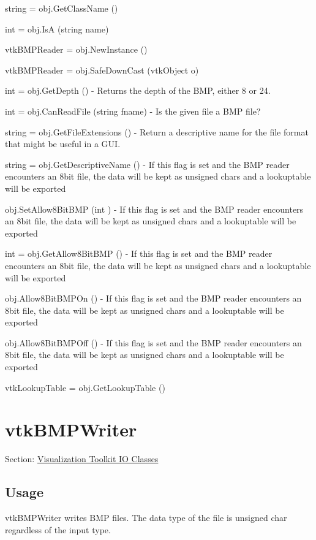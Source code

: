 \begin{DoxyItemize}
\item {\ttfamily string = obj.\-Get\-Class\-Name ()}  
\item {\ttfamily int = obj.\-Is\-A (string name)}  
\item {\ttfamily vtk\-B\-M\-P\-Reader = obj.\-New\-Instance ()}  
\item {\ttfamily vtk\-B\-M\-P\-Reader = obj.\-Safe\-Down\-Cast (vtk\-Object o)}  
\item {\ttfamily int = obj.\-Get\-Depth ()} -\/ Returns the depth of the B\-M\-P, either 8 or 24.  
\item {\ttfamily int = obj.\-Can\-Read\-File (string fname)} -\/ Is the given file a B\-M\-P file?  
\item {\ttfamily string = obj.\-Get\-File\-Extensions ()} -\/ Return a descriptive name for the file format that might be useful in a G\-U\-I.  
\item {\ttfamily string = obj.\-Get\-Descriptive\-Name ()} -\/ If this flag is set and the B\-M\-P reader encounters an 8bit file, the data will be kept as unsigned chars and a lookuptable will be exported  
\item {\ttfamily obj.\-Set\-Allow8\-Bit\-B\-M\-P (int )} -\/ If this flag is set and the B\-M\-P reader encounters an 8bit file, the data will be kept as unsigned chars and a lookuptable will be exported  
\item {\ttfamily int = obj.\-Get\-Allow8\-Bit\-B\-M\-P ()} -\/ If this flag is set and the B\-M\-P reader encounters an 8bit file, the data will be kept as unsigned chars and a lookuptable will be exported  
\item {\ttfamily obj.\-Allow8\-Bit\-B\-M\-P\-On ()} -\/ If this flag is set and the B\-M\-P reader encounters an 8bit file, the data will be kept as unsigned chars and a lookuptable will be exported  
\item {\ttfamily obj.\-Allow8\-Bit\-B\-M\-P\-Off ()} -\/ If this flag is set and the B\-M\-P reader encounters an 8bit file, the data will be kept as unsigned chars and a lookuptable will be exported  
\item {\ttfamily vtk\-Lookup\-Table = obj.\-Get\-Lookup\-Table ()}  
\end{DoxyItemize}\hypertarget{vtkio_vtkbmpwriter}{}\section{vtk\-B\-M\-P\-Writer}\label{vtkio_vtkbmpwriter}
Section\-: \hyperlink{sec_vtkio}{Visualization Toolkit I\-O Classes} \hypertarget{vtkwidgets_vtkxyplotwidget_Usage}{}\subsection{Usage}\label{vtkwidgets_vtkxyplotwidget_Usage}
vtk\-B\-M\-P\-Writer writes B\-M\-P files. The data type of the file is unsigned char regardless of the input type.


